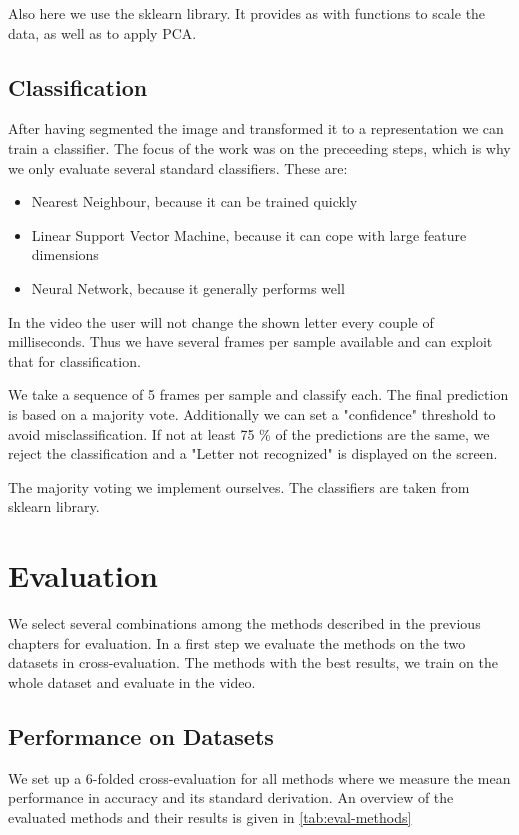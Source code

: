 \documentclass[letterpaper, 10 pt, conference]{ieeeconf}  %
\begin{document}
Also here we use the sklearn library. It provides as with functions to scale the data, as well as to apply PCA.

\subsection{Classification}

After having segmented the image and transformed it to a representation we can train a classifier. The focus of the work was on the preceeding steps, which is why we only evaluate several standard classifiers. These are:

\begin{itemize}
	\item Nearest Neighbour, because it can be trained quickly 
	\item Linear Support Vector Machine, because it can cope with large feature dimensions
	\item Neural Network, because it generally performs well
\end{itemize}

In the video the user will not change the shown letter every couple of milliseconds. Thus we have several frames per sample available and can exploit that for classification. 

We take a sequence of 5 frames per sample and classify each. The final prediction is based on a majority vote. Additionally we can set a "confidence" threshold to avoid misclassification. If not at least 75 \% of the predictions are the same, we reject the classification and a "Letter not recognized" is displayed on the screen.

The majority voting we implement ourselves. The classifiers are taken from sklearn library.

\section{Evaluation}
\label{sec:eval}
We select several combinations among the methods described in the previous chapters for evaluation. In a first step we evaluate the methods on the two datasets in cross-evaluation. The methods with the best results, we train on the whole dataset and evaluate in the video.

\subsection{Performance on Datasets}

We set up a 6-folded cross-evaluation for all methods where we measure the mean performance in accuracy and its standard derivation. An overview of the evaluated methods and their results is given in \autoref{tab:eval-methods}
\end{document}
